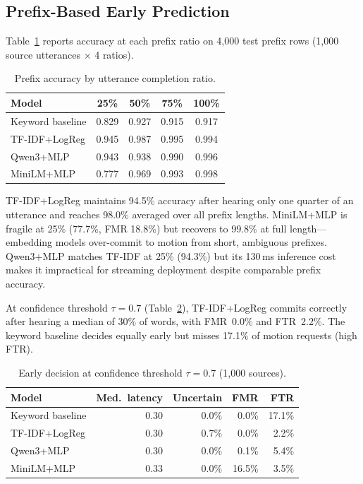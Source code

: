 \documentclass{article}
\begin{document}
\subsection{Prefix-Based Early Prediction}

Table~\ref{tab:prefix} reports accuracy at each prefix ratio on 4{,}000 test
prefix rows (1{,}000 source utterances $\times$ 4 ratios).

\begin{table}[h]
  \centering
  \caption{Prefix accuracy by utterance completion ratio.}
  \label{tab:prefix}
  \begin{tabular}{lcccc}
    \toprule
    Model & 25\% & 50\% & 75\% & 100\% \\
    \midrule
    Keyword baseline & 0.829 & 0.927 & 0.915 & 0.917 \\
    TF-IDF+LogReg    & 0.945 & 0.987 & 0.995 & 0.994 \\
    Qwen3+MLP        & 0.943 & 0.938 & 0.990 & 0.996 \\
    MiniLM+MLP       & 0.777 & 0.969 & 0.993 & 0.998 \\
    \bottomrule
  \end{tabular}
\end{table}

TF-IDF+LogReg maintains 94.5\% accuracy after hearing only one quarter of an
utterance and reaches 98.0\% averaged over all prefix lengths.
MiniLM+MLP is fragile at 25\% (77.7\%, FMR 18.8\%) but recovers to 99.8\% at
full length---embedding models over-commit to motion from short, ambiguous
prefixes.
Qwen3+MLP matches TF-IDF at 25\% (94.3\%) but its 130\,ms inference cost
makes it impractical for streaming deployment despite comparable prefix
accuracy.

At confidence threshold $\tau = 0.7$ (Table~\ref{tab:early}), TF-IDF+LogReg
commits correctly after hearing a median of 30\% of words, with FMR~0.0\% and
FTR~2.2\%.
The keyword baseline decides equally early but misses 17.1\% of motion
requests (high FTR).

\begin{table}[h]
  \centering
  \caption{Early decision at confidence threshold $\tau = 0.7$ (1{,}000 sources).}
  \label{tab:early}
  \small
  \begin{tabular}{lrrrr}
    \toprule
    Model & Med.\ latency & Uncertain & FMR & FTR \\
    \midrule
    Keyword baseline & 0.30 & 0.0\% & 0.0\% & 17.1\% \\
    TF-IDF+LogReg    & 0.30 & 0.7\% & 0.0\% & 2.2\% \\
    Qwen3+MLP        & 0.30 & 0.0\% & 0.1\% & 5.4\% \\
    MiniLM+MLP       & 0.33 & 0.0\% & 16.5\% & 3.5\% \\
    \bottomrule
  \end{tabular}
\end{table}
\end{document}
